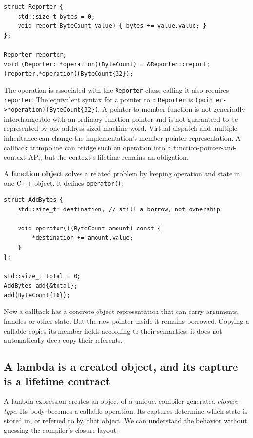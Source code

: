 \begin{verbatim}
struct Reporter {
    std::size_t bytes = 0;
    void report(ByteCount value) { bytes += value.value; }
};

Reporter reporter;
void (Reporter::*operation)(ByteCount) = &Reporter::report;
(reporter.*operation)(ByteCount{32});
\end{verbatim}

The operation is associated with the \texttt{Reporter} class; calling it also requires \texttt{reporter}. The equivalent syntax for a pointer to a \texttt{Reporter} is \texttt{(pointer-\textgreater{}*operation)(ByteCount\{32\})}. A pointer-to-member function is not generically interchangeable with an ordinary function pointer and is not guaranteed to be represented by one address-sized machine word. Virtual dispatch and multiple inheritance can change the implementation's member-pointer representation. A callback trampoline can bridge such an operation into a function-pointer-and-context API, but the context's lifetime remains an obligation.

A \textbf{function object} solves a related problem by keeping operation and state in one C++ object. It defines \texttt{operator()}:

\begin{verbatim}
struct AddBytes {
    std::size_t* destination; // still a borrow, not ownership

    void operator()(ByteCount amount) const {
        *destination += amount.value;
    }
};

std::size_t total = 0;
AddBytes add{&total};
add(ByteCount{16});
\end{verbatim}

Now a callback has a concrete object representation that can carry arguments, handles or other state. But the raw pointer inside it remains borrowed. Copying a callable copies its member fields according to their semantics; it does not automatically deep-copy their referents.

\subsection{A lambda is a created object, and its capture is a lifetime contract}\label{05-engine-i-ch004-a-lambda-is-a-created-object-and-its-capture-is-a-lifetime-contract}

A lambda expression creates an object of a unique, compiler-generated \emph{closure type}. Its body becomes a callable operation. Its captures determine which state is stored in, or referred to by, that object. We can understand the behavior without guessing the compiler's closure layout.

